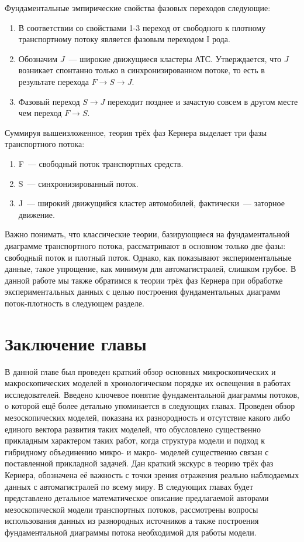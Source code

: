 Фундаментальные эмпирические свойства фазовых переходов следующие:
\begin{enumerate}
  \item В соответствии со свойствами 1-3 переход от свободного к плотному транспортному потоку является фазовым переходом I рода.
  \item Обозначим \(J\)~--- широкие движущиеся кластеры АТС. Утверждается, что \(J\) возникает спонтанно только в синхронизированном потоке, то есть в результате перехода \(F\rightarrow S\rightarrow J\).
  \item Фазовый переход \(S\rightarrow J\) переходит позднее и зачастую совсем в другом месте чем переход \(F\rightarrow S\).
\end{enumerate}
 
Суммируя вышеизложенное, теория трёх фаз Кернера выделает три фазы транспортного потока:
\begin{enumerate}
  \item F~--- свободный поток транспортных средств.
  \item S~--- синхронизированный поток.
  \item J~--- широкий движущийся кластер автомобилей, фактически~--- заторное движение.
\end{enumerate}
Важно понимать, что классические теории, базирующиеся на фундаментальной диаграмме транспортного потока, рассматривают в основном только две фазы: свободный поток и плотный поток.
Однако, как показывают экспериментальные данные, такое упрощение, как минимум для автомагистралей, слишком грубое.
В данной работе мы также обратимся к теории трёх фаз Кернера при обработке экспериментальных данных с целью построения фундаментальных диаграмм поток-плотность в следующем разделе.


\section{Заключение главы}\label{subsec:ch1/sec5}
В данной главе был проведен краткий обзор основных микроскопических и макроскопических моделей в хронологическом порядке их освещения в работах исследователей.
Введено ключевое понятие фундаментальной диаграммы потоков, о которой ещё более детально упоминается в следующих главах.
Проведен обзор мезоскопических моделей, показана их разнородность и отсутствие какого либо единого вектора развития таких моделей, что обусловлено существенно прикладным характером таких работ, когда структура модели и подход к гибридному объединению микро- и макро- моделей существенно связан с поставленной прикладной задачей.
Дан краткий экскурс в теорию трёх фаз Кернера, обозначена её важность с точки зрения отражения реально наблюдаемых данных с автомагистралей по всему миру.
В следующих главах будет представлено детальное математическое описание предлагаемой авторами мезоскопической модели транспортных потоков, рассмотрены вопросы использования данных из разнородных источников а также построения фундаментальной диаграммы потока необходимой для работы модели.

\FloatBarrier 